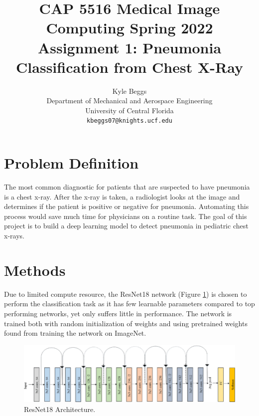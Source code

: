\documentclass[10pt,twocolumn,letterpaper]{article}
\begin{document}
\title{CAP 5516 Medical Image Computing Spring 2022 Assignment 1: Pneumonia Classification from Chest X-Ray}

\author{Kyle Beggs\\
Department of Mechanical and Aerospace Engineering\\ 
University of Central Florida\\
{\tt\small kbeggs07@knights.ucf.edu}}

\maketitle
\ificcvfinal\thispagestyle{empty}\fi


\section{Problem Definition}

The most common diagnostic for patients that are suspected to have pneumonia is a chest x-ray. After the x-ray is taken, a radiologist looks at the image and determines if the patient is positive or negative for pneumonia. Automating this process would save much time for physicians on a routine task. The goal of this project is to build a deep learning model to detect pneumonia in pediatric chest x-rays.


\section{Methods}
Due to limited compute resource, the ResNet18 network (Figure \ref{fig:fig1}) is chosen to perform the classification task as it has few learnable parameters compared to top performing networks, yet only suffers little in performance. The network is trained both with random initialization of weights and using pretrained weights found from training the network on ImageNet.

\begin{figure}[h]
\begin{center}
   \includegraphics[width=0.95\linewidth]{images/Original-ResNet-18-Architecture.png}
\end{center}
   \caption{ResNet18 Architecture.}
\label{fig:fig1}
\end{figure}
\end{document}
